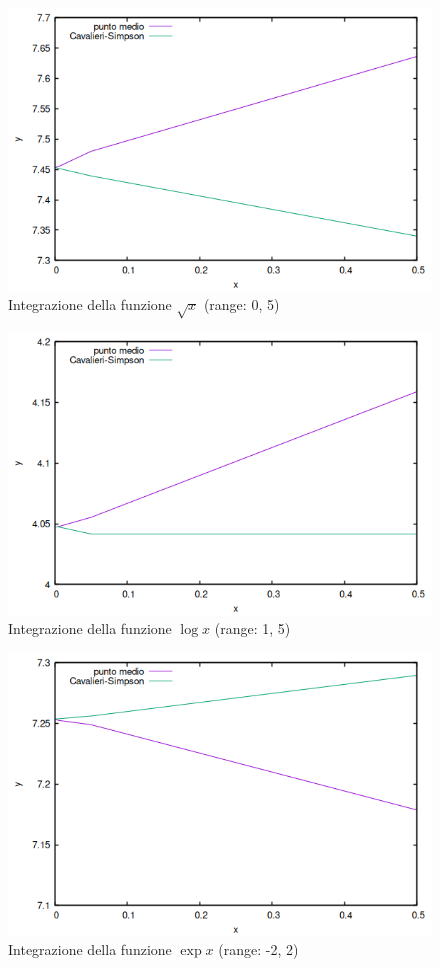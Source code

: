 \documentclass{article}
\begin{document}
\begin{figure}[ht]
   \centering
   \includegraphics*[scale=.5]{../grafici/immagini/sqrt_integrazione.png}
   \caption{Integrazione della funzione $\sqrt{x}$ (range: 0, 5)}
\end{figure}
\begin{figure}[ht]
   \centering
   \includegraphics*[scale=.5]{../grafici/immagini/log_integrazione.png}
   \caption{Integrazione della funzione $\log x$ (range: 1, 5)}
\end{figure}
\begin{figure}[ht]
   \centering
   \includegraphics*[scale=.5]{../grafici/immagini/exp_integrazione.png}
   \caption{Integrazione della funzione $\exp x$ (range: -2, 2)}
\end{figure}
\end{document}

